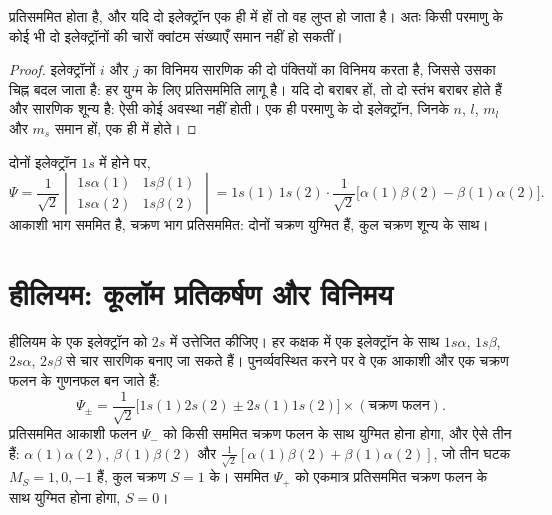 \begin{theorem}[पाउली सिद्धांत]\label{thm:b3:many-electron-atoms:pauli}
 प्रतिसममित होता है, और यदि दो इलेक्ट्रॉन एक ही  में
हों तो वह लुप्त हो जाता है। अतः किसी परमाणु के कोई भी दो इलेक्ट्रॉनों की
चारों क्वांटम संख्याएँ समान नहीं हो सकतीं।
\end{theorem}

\begin{proof}
इलेक्ट्रॉनों $i$ और $j$ का विनिमय सारणिक की दो पंक्तियों का विनिमय करता है,
जिससे उसका चिह्न बदल जाता है: हर युग्म के लिए प्रतिसममिति लागू है। यदि दो
 बराबर हों, तो दो स्तंभ बराबर होते हैं और सारणिक शून्य है:
ऐसी कोई अवस्था नहीं होती। एक ही परमाणु के दो इलेक्ट्रॉन, जिनके $n$, $l$,
$m_l$ और $m_s$ समान हों, एक ही  में होते।
\end{proof}

\begin{example}[हीलियम की मूल अवस्था]\label{ex:b3:many-electron-atoms:helium-ground}
दोनों इलेक्ट्रॉन $1s$ में होने पर,
\[
\Psi = \frac{1}{\sqrt2}\begin{vmatrix}1s\alpha(1) & 1s\beta(1)\\ 1s\alpha(2) &
1s\beta(2)\end{vmatrix} = 1s(1)\,1s(2)\cdot\frac{1}{\sqrt2}\big[\alpha(1)\beta(2)
- \beta(1)\alpha(2)\big].
\]
आकाशी भाग सममित है, चक्रण भाग प्रतिसममित: दोनों चक्रण
युग्मित हैं, कुल चक्रण शून्य के साथ।
\end{example}

\section{हीलियम: कूलॉम प्रतिकर्षण और विनिमय}

हीलियम के एक इलेक्ट्रॉन को $2s$ में उत्तेजित कीजिए। हर कक्षक में एक इलेक्ट्रॉन के साथ
$1s\alpha$, $1s\beta$, $2s\alpha$, $2s\beta$ से चार सारणिक बनाए जा सकते हैं।
पुनर्व्यवस्थित करने पर वे एक आकाशी और एक चक्रण फलन के गुणनफल बन जाते हैं:
\[
\Psi_\pm = \frac{1}{\sqrt2}\big[1s(1)2s(2) \pm 2s(1)1s(2)\big]\times(\text{चक्रण
फलन}).
\]
प्रतिसममित आकाशी फलन $\Psi_-$ को किसी सममित
चक्रण फलन के साथ युग्मित होना होगा, और ऐसे तीन हैं: $\alpha(1)\alpha(2)$,
$\beta(1)\beta(2)$ और $\frac{1}{\sqrt2}[\alpha(1)\beta(2) + \beta(1)\alpha(2)]$, जो
तीन घटक $M_S = 1, 0, -1$ हैं, कुल चक्रण $S = 1$ के। सममित
$\Psi_+$ को एकमात्र प्रतिसममित चक्रण फलन के साथ युग्मित होना होगा, $S = 0$।

